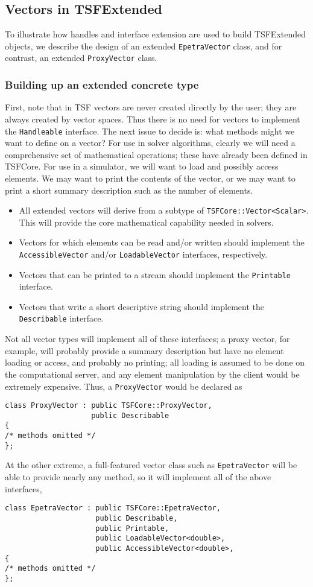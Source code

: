 \subsection{Vectors in TSFExtended}

To illustrate how handles and interface extension are used to
build TSFExtended objects,
we describe the design of an extended {\tt EpetraVector} class, 
and for contrast, an extended {\tt ProxyVector} class. 

\subsubsection{Building up an extended concrete type}

First, note
that in TSF vectors are never created directly by the user; they are always 
created by vector spaces. Thus there is no need for vectors to implement
the {\tt Handleable} interface. The next issue to decide is:
what methods might we want to define on a vector? For use in solver
algorithms, clearly we will need
a comprehensive set of mathematical operations; these have already been
defined in TSFCore. For use in a simulator, we will want to load and
possibly access elements. We may want to print the contents of the vector,
or we may want to print a short summary description such as the number of
elements. 
\begin{itemize}
\item All extended vectors will derive from 
a subtype of {\tt TSFCore::Vector<Scalar>}. This will provide the core
mathematical capability needed in solvers.
\item Vectors for which elements can be read and/or written should implement
the {\tt AccessibleVector} and/or {\tt LoadableVector} interfaces, 
respectively.
\item Vectors that can be printed to a stream should implement the
{\tt Printable} interface.
\item Vectors that write a short descriptive string should
implement the {\tt Describable} interface.
\end{itemize}
Not all vector types will implement all of these interfaces; a 
proxy vector, for example, will probably provide a summary
description but have no element loading or access, 
and probably no printing; 
all loading is assumed to be done on the computational server, and any element
manipulation by the client would 
be extremely expensive. Thus, a {\tt ProxyVector} would be
declared as
\begin{verbatim}
class ProxyVector : public TSFCore::ProxyVector,
                    public Describable
{
/* methods omitted */
};
\end{verbatim}
At the other extreme, a full-featured
vector class such as {\tt EpetraVector} will be able to provide nearly
any method, so it will implement all of the above interfaces,
\begin{verbatim}
class EpetraVector : public TSFCore::EpetraVector,
                     public Describable,
                     public Printable,
                     public LoadableVector<double>,
                     public AccessibleVector<double>,
{
/* methods omitted */
};
\end{verbatim}

